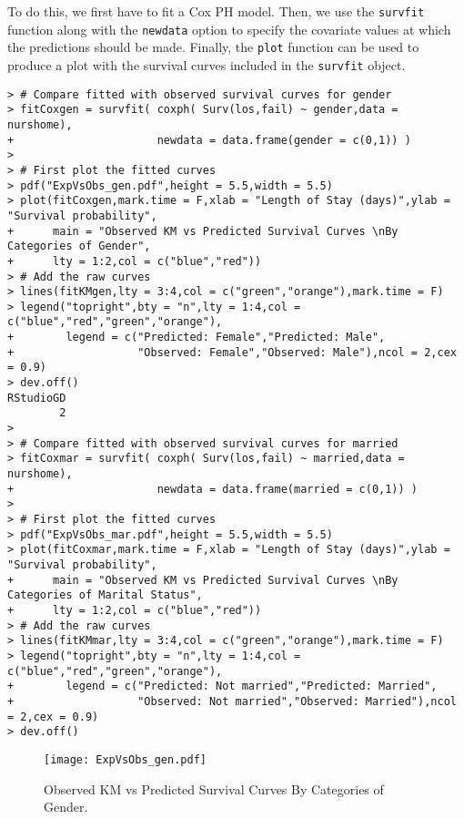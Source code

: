 \begin{enumerate}[(i)]
To do this, we first have to fit a Cox PH model. Then, we use the \verb|survfit| function along with the \verb|newdata| option to specify the covariate values at which the predictions should be made. Finally, the \verb|plot| function can be used to produce a plot with the survival curves included in the \verb|survfit| object.
\begin{spacing}{1.2}
\begin{footnotesize}
\begin{verbatim}
> # Compare fitted with observed survival curves for gender
> fitCoxgen = survfit( coxph( Surv(los,fail) ~ gender,data = nurshome),
+                      newdata = data.frame(gender = c(0,1)) )
> 
> # First plot the fitted curves
> pdf("ExpVsObs_gen.pdf",height = 5.5,width = 5.5)
> plot(fitCoxgen,mark.time = F,xlab = "Length of Stay (days)",ylab = "Survival probability",
+      main = "Observed KM vs Predicted Survival Curves \nBy Categories of Gender",
+      lty = 1:2,col = c("blue","red"))
> # Add the raw curves
> lines(fitKMgen,lty = 3:4,col = c("green","orange"),mark.time = F)
> legend("topright",bty = "n",lty = 1:4,col = c("blue","red","green","orange"),
+        legend = c("Predicted: Female","Predicted: Male",
+                   "Observed: Female","Observed: Male"),ncol = 2,cex = 0.9)
> dev.off()
RStudioGD 
        2 
> 
> # Compare fitted with observed survival curves for married
> fitCoxmar = survfit( coxph( Surv(los,fail) ~ married,data = nurshome),
+                      newdata = data.frame(married = c(0,1)) )
> 
> # First plot the fitted curves
> pdf("ExpVsObs_mar.pdf",height = 5.5,width = 5.5)
> plot(fitCoxmar,mark.time = F,xlab = "Length of Stay (days)",ylab = "Survival probability",
+      main = "Observed KM vs Predicted Survival Curves \nBy Categories of Marital Status",
+      lty = 1:2,col = c("blue","red"))
> # Add the raw curves
> lines(fitKMmar,lty = 3:4,col = c("green","orange"),mark.time = F)
> legend("topright",bty = "n",lty = 1:4,col = c("blue","red","green","orange"),
+        legend = c("Predicted: Not married","Predicted: Married",
+                   "Observed: Not married","Observed: Married"),ncol = 2,cex = 0.9)
> dev.off() 
\end{verbatim}
\end{footnotesize}
\end{spacing}

\begin{figure}[htbp]
	\centering
		\texttt{[image: ExpVsObs\_gen.pdf]}
	\caption{Observed KM vs Predicted Survival Curves By Categories of Gender.}
	\label{figure3}
\end{figure}


\end{enumerate}
